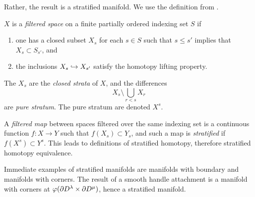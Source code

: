 Rather, the result is a stratified manifold.
We use the definition from \cite{wein94}.

\begin{defn}[Stratification]
	$X$ is a \emph{filtered space} on a finite partially ordered indexing set $S$ if 
	\begin{enumerate}
		\item one has a closed subset $X_s$ for each $s\in S$ such that $s\leq s'$ implies that $X_s\subset S_{s'}$, and
		\item the inclusions $X_s \hookrightarrow X_{s'}$ satisfy the homotopy lifting property.
	\end{enumerate}
	The $X_s$ are the \emph{closed strata} of $X$, and the differences
	$$X_s\setminus \bigcup_{r < s} X_r$$
	are \emph{pure stratum}.
	The pure stratum are denoted $X^s$.
	
	A \emph{filtered map} between spaces filtered over the same indexing set is a continuous function $f:X\to Y$ such that $f(X_s)\subset Y_s$, and such a map is \emph{stratified} if $f(X^s) \subset Y^s$.
	This leads to definitions of stratified homotopy, therefore stratified homotopy equivalence.
\end{defn}

Immediate examples of stratified manifolds are manifolds with boundary and manifolds with corners.
The result of a smooth handle attachment is a manifold with corners at $\varphi(\partial D^\lambda \times \partial D^\mu)$, hence a stratified manifold.



